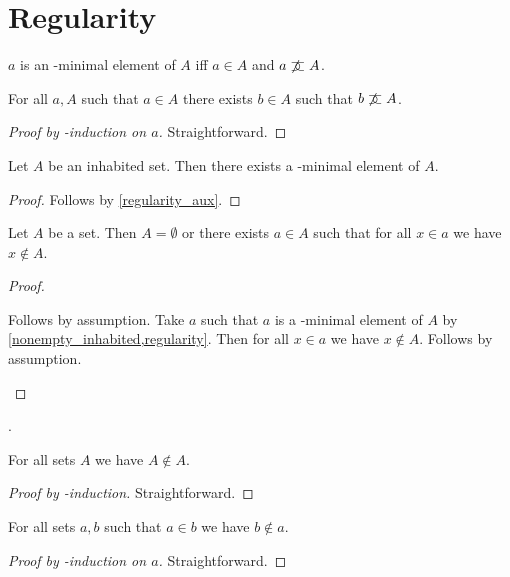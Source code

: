 

\section{Regularity}

\begin{abbreviation}\label{elemminimal}
    $a$ is an \in-minimal element of $A$ iff
    $a\in A$ and $a\mathrel{\not\mathrel{\supset\!\!\!\subset}} A$.
\end{abbreviation}

\begin{lemma}\label{regularity_aux}
    For all $a, A$ such that $a\in A$
    there exists $b\in A$ such that
    $b\mathrel{\not\mathrel{\supset\!\!\!\subset}} A$.
\end{lemma}
\begin{proof}[Proof by \in-induction on $a$]
    Straightforward.
\end{proof}

\begin{proposition}[Regularity]%
\label{regularity}
    Let $A$ be an inhabited set.
    Then there exists a \in-minimal element of $A$.
\end{proposition}
\begin{proof}
    Follows by \cref{regularity_aux}.
\end{proof}


\begin{theorem}[Foundation]\label{foundation}
    Let $A$ be a set.
    Then $A = \emptyset$ or there exists $a\in A$
    such that for all $x\in a$ we have $x\notin A$.
\end{theorem}
\begin{proof}
    \begin{byCase}
            Follows by assumption.
            Take $a$ such that $a$ is a \in-minimal element of $A$ by \cref{nonempty_inhabited,regularity}.
            Then for all $x\in a$ we have $x\notin A$.
            Follows by assumption.
    \end{byCase}
\end{proof}.

\begin{proposition}\label{in_irrefl}
    For all sets $A$ we have $A\not\in A$.
\end{proposition}
\begin{proof}[Proof by \in-induction]
    Straightforward.
\end{proof}

\begin{proposition}\label{in_asymmetric}
    For all sets $a, b$ such that $a\in b$ we have $b\notin a$.
\end{proposition}
\begin{proof}[Proof by \in-induction on $a$]
    Straightforward.
\end{proof}

